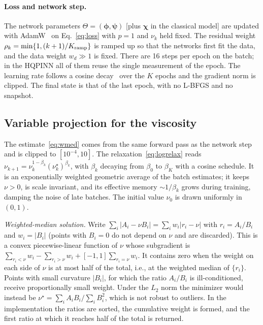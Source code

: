 \documentclass[floatfix,aps,pra,twocolumn,superscriptaddress,10pt,nofootinbib]{revtex4-2}
\begin{document}
\begin{appendices}
\paragraph{Loss and network step.} The network parameters $\Theta=(\bm\phi,\bm\psi)$ [plus $\bm\chi$ in the classical model] are updated with AdamW~\cite{loshchilov2019decoupled} on Eq.~\eqref{eq:loss} with $p=1$ and $\nu_k$ held fixed. The residual weight $\rho_k=\min\{1,(k+1)/K_{\rm ramp}\}$ is ramped up so that the networks first fit the data, and the data weight $w_d\gg1$ is fixed. There are 16 steps per epoch on the batch; in the HQPINN all of them reuse the single measurement of the epoch. The learning rate follows a cosine decay~\cite{loshchilov2017sgdr} over the $K$ epochs and the gradient norm is clipped. The final state is that of the last epoch, with no L-BFGS and no snapshot.

\subsection{Variable projection for the viscosity}\label{app:varpro}
The estimate~\eqref{eq:wmed} comes from the same forward pass as the network step and is clipped to $[10^{-4},10]$. The relaxation~\eqref{eq:logrelax} reads $\nu_{k+1}=\nu_k^{1-\beta_k}(\nu^\star_k)^{\beta_k}$, with $\beta_k$ decaying from $\beta_0$ to $\beta_K$ with a cosine schedule. It is an exponentially weighted geometric average of the batch estimates; it keeps $\nu>0$, is scale invariant, and its effective memory $\sim1/\beta_k$ grows during training, damping the noise of late batches. The initial value $\nu_0$ is drawn uniformly in $(0,1)$.

\emph{Weighted-median solution.} Write $\sum_i|A_i-\nu B_i|=\sum_iw_i|r_i-\nu|$ with $r_i=A_i/B_i$ and $w_i=|B_i|$ (points with $B_i=0$ do not depend on $\nu$ and are discarded). This is a convex piecewise-linear function of $\nu$ whose subgradient is $\sum_{r_i<\nu}w_i-\sum_{r_i>\nu}w_i+[-1,1]\sum_{r_i=\nu}w_i$. It contains zero when the weight on each side of $\nu$ is at most half of the total, i.e., at the weighted median of $\{r_i\}$. Points with small curvature $|B_i|$, for which the ratio $A_i/B_i$ is ill-conditioned, receive proportionally small weight. Under the $L_2$ norm the minimizer would instead be $\nu^\star=\sum_iA_iB_i/\sum_iB_i^2$, which is not robust to outliers. In the implementation the ratios are sorted, the cumulative weight is formed, and the first ratio at which it reaches half of the total is returned.


\end{appendices}
\end{document}
